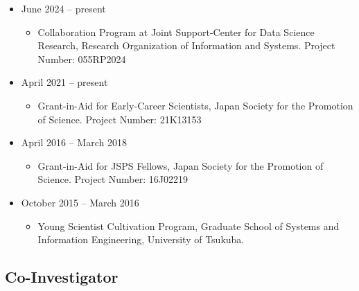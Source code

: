 \documentclass[
]{book}
\providecommand{\tightlist}{%
  \setlength{\itemsep}{0pt}\setlength{\parskip}{0pt}}
\begin{document}
\begin{itemize}
\tightlist
\item
  June 2024 -- present

  \begin{itemize}
  \tightlist
  \item
    Collaboration Program at Joint Support-Center for Data Science Research,
    Research Organization of Information and Systems.
    Project Number: 055RP2024
  \end{itemize}
\item
  April 2021 -- present

  \begin{itemize}
  \tightlist
  \item
    Grant-in-Aid for Early-Career Scientists,
    Japan Society for the Promotion of Science.
    Project Number: 21K13153
  \end{itemize}
\item
  April 2016 -- March 2018

  \begin{itemize}
  \tightlist
  \item
    Grant-in-Aid for JSPS Fellows,
    Japan Society for the Promotion of Science.
    Project Number: 16J02219
  \end{itemize}
\item
  October 2015 -- March 2016

  \begin{itemize}
  \tightlist
  \item
    Young Scientist Cultivation Program,
    Graduate School of Systems and Information Engineering, University of Tsukuba.
  \end{itemize}
\end{itemize}

\subsection*{Co-Investigator}\label{co-investigator}
\end{document}
